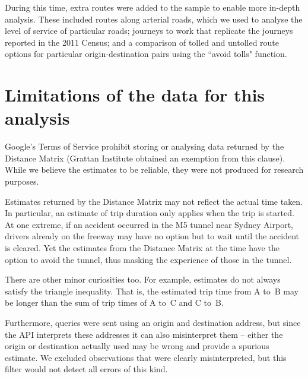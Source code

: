 \documentclass{grattan}
\begin{document}
During this time, extra routes were added to the sample to enable more in-depth analysis.
These included routes along arterial roads, which we used to analyse the level of service of particular roads; journeys to work that replicate the journeys reported in the 2011 Census; and a comparison of tolled and untolled route options for particular origin-destination pairs using the ``avoid tolls" function.

\section{Limitations of the data for this analysis}
Google's Terms of Service prohibit storing or analysing data returned by the Distance Matrix (Grattan Institute obtained an exemption from this clause).
While we believe the estimates to be reliable, they were not produced for research purposes.

Estimates returned by the Distance Matrix may not reflect the actual time taken.
In particular, an estimate of trip duration only applies when the trip is started.
At one extreme, if an accident occurred in the M5 tunnel near Sydney Airport, drivers already on the freeway may have no option but to wait until the accident is cleared.
Yet the estimates from the Distance Matrix at the time have the option to avoid the tunnel, thus masking the experience of those in the tunnel.

There are other minor curiosities too.
For example, estimates do not always satisfy the triangle inequality.
That is, the estimated trip time from A to~B may be longer than the sum of trip times of A to~C and C to~B.

Furthermore, queries were sent using an origin and destination address, but since the API interprets these addresses it can also misinterpret them -- either the origin or destination actually used may be wrong and provide a spurious estimate.
We excluded observations that were clearly misinterpreted, but this filter would not detect all errors of this kind.
\end{document}
